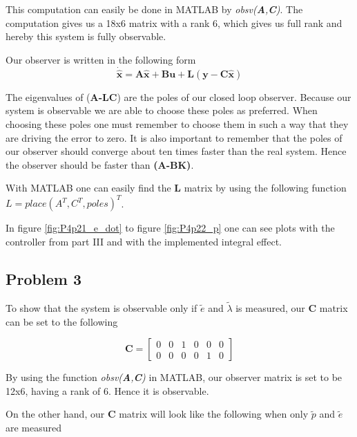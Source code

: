 This computation can easily be done in MATLAB by \textit{obsv(\textbf{A},\textbf{C})}. The computation gives us a 18x6 matrix with a rank 6, which gives us full rank and hereby this system is fully observable. \newline

Our observer is written in the following form
\begin{equation}
    \bm{\dot{\hat{x}} = A\hat{x} + Bu + L(y-C\hat{x})}
\end{equation}

The eigenvalues of (\textbf{A-LC}) are the poles of our closed loop observer. Because our system is observable we are able to choose these poles as preferred. When choosing these poles one must remember to choose them in such a way that they are driving the error to zero. It is also important to remember that the poles of our observer should converge about ten times faster than the real system. Hence the observer should be faster than \textbf{(A-BK)}.

With MATLAB one can easily find the \textbf{L} matrix by using the following function 
$L = place(A^{T}, C^{T}, poles)^{T}$. \newline

In figure \ref{fig:P4p21_e_dot} to figure \ref{fig:P4p22_p} one can see plots with the controller from part III and with the implemented integral effect. 
\newpage







\subsection{Problem 3}

To show that the system is observable only if $\tilde{e}$ and $\tilde{\lambda}$ is measured, our $\bm{C}$ matrix can be set to the following

\begin{equation*}
  \bm{C} =
  \begin{bmatrix}
    0 & 0 & 1 & 0 & 0 & 0 \\
    0 & 0 & 0 & 0 & 1 & 0
  \end{bmatrix}
\end{equation*}

By using the function \textit{obsv(\textbf{A},\textbf{C})} in MATLAB, our observer matrix is set to be 12x6, having a rank of 6. Hence it is observable. 

On the other hand, our $\bm{C}$ matrix will look like the following when only $\tilde{p}$ and $\tilde{e}$ are measured

